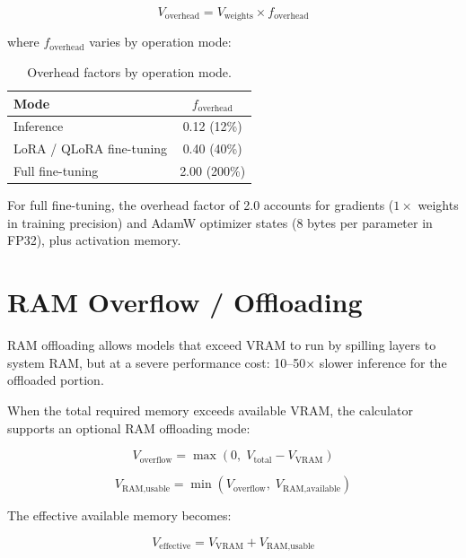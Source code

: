 \documentclass[11pt,a4paper]{article}
\theoremstyle{definition}
\begin{document}
\begin{equation}\label{eq:overhead}
V_{\text{overhead}} = V_{\text{weights}} \times f_{\text{overhead}}
\end{equation}

where $f_{\text{overhead}}$ varies by operation mode:

\begin{table}[htbp]
\centering
\caption{Overhead factors by operation mode.}\label{tab:overhead}
\begin{tabular}{lc}
\toprule
\textbf{Mode} & $f_{\text{overhead}}$ \\
\midrule
Inference & 0.12 (12\%) \\
LoRA / QLoRA fine-tuning & 0.40 (40\%) \\
Full fine-tuning & 2.00 (200\%) \\
\bottomrule
\end{tabular}
\end{table}

For full fine-tuning, the overhead factor of 2.0 accounts for gradients ($1\times$ weights in training precision) and AdamW optimizer states ($8$ bytes per parameter in FP32), plus activation memory.

\section{RAM Overflow / Offloading}

\begin{warnbox}
RAM offloading allows models that exceed VRAM to run by spilling layers to system RAM, but at a severe performance cost: 10--50$\times$ slower inference for the offloaded portion.
\end{warnbox}

When the total required memory exceeds available VRAM, the calculator supports an optional RAM offloading mode:

\begin{equation}\label{eq:overflow}
V_{\text{overflow}} = \max(0, \; V_{\text{total}} - V_{\text{VRAM}})
\end{equation}

\begin{equation}\label{eq:ramusable}
V_{\text{RAM,usable}} = \min(V_{\text{overflow}}, \; V_{\text{RAM,available}})
\end{equation}

The effective available memory becomes:

\begin{equation}\label{eq:effective}
V_{\text{effective}} = V_{\text{VRAM}} + V_{\text{RAM,usable}}
\end{equation}
\end{document}
